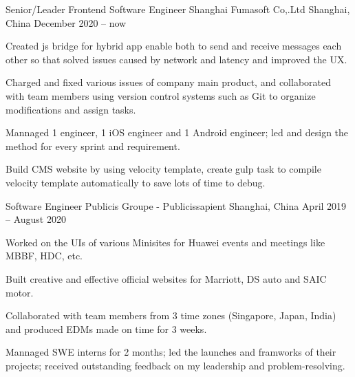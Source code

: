 
\begin{cventries}

  \cventry
    {Senior/Leader Frontend Software Engineer} %
    { Shanghai Fumasoft Co,.Ltd} %
    {Shanghai, China} %
    {December 2020 -- now} %
    {
      \begin{cvitems} %
        \item{Created js bridge for hybrid app enable both to send and receive messages each other so that solved issues caused by network and latency and improved the UX. }
        \item{Charged and fixed various issues of company main product, and collaborated with team members using version control systems such as Git to organize modifications and assign tasks.}
        \item{Mannaged 1 engineer, 1 iOS engineer and 1 Android engineer; led and design the method for every sprint and requirement.}
        \item{Build CMS website by using velocity template, create gulp task to compile velocity template automatically to save lots of time to debug.}
      \end{cvitems}
    }

  \cventry
    {Software Engineer} %
    {Publicis Groupe - Publicissapient} %
    {Shanghai, China} %
    {April 2019 -- August 2020} %
    {
      \begin{cvitems} %
        \item{Worked on the UIs of various Minisites for Huawei events and meetings like MBBF, HDC, etc.}
        \item{Built creative and effective official websites for Marriott, DS auto and SAIC motor.}
        \item{Collaborated with team members from 3 time zones (Singapore, Japan, India) and produced EDMs made on time for 3 weeks.}
        \item{Mannaged SWE interns for 2 months; led the launches and framworks of their projects; received outstanding feedback on my leadership and problem-resolving.}
      \end{cvitems}
    }

\end{cventries}
